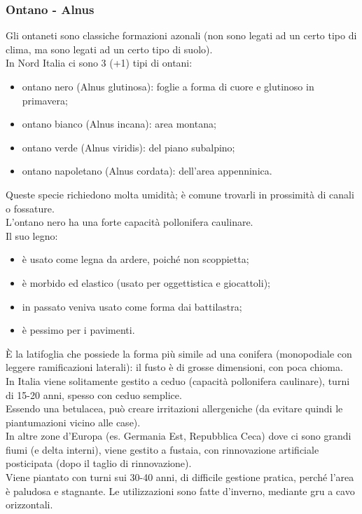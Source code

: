 \subsubsection{Ontano - Alnus}
Gli ontaneti sono classiche formazioni azonali (non sono legati ad un certo tipo di clima, ma sono legati ad un certo tipo di suolo).\\
In Nord Italia ci sono 3 (+1) tipi di ontani:
\begin{itemize}[nosep]
    \item ontano nero (Alnus glutinosa): foglie a forma di cuore e glutinoso in primavera;
    \item ontano bianco (Alnus incana): area montana;
    \item ontano verde (Alnus viridis): del piano subalpino;
    \item ontano napoletano (Alnus cordata): dell'area appenninica.
\end{itemize}
Queste specie richiedono molta umidità; è comune trovarli in prossimità di canali o fossature.\\
L'ontano nero ha una forte capacità pollonifera caulinare.\\
Il suo legno:
\begin{itemize}[nosep]
    \item è usato come legna da ardere, poiché non scoppietta;
    \item è morbido ed elastico (usato per oggettistica e giocattoli);
    \item in passato veniva usato come forma dai battilastra;
    \item è pessimo per i pavimenti.
\end{itemize}
È la latifoglia che possiede la forma più simile ad una conifera (monopodiale con leggere ramificazioni laterali): il fusto è di grosse dimensioni, con poca chioma.\\
In Italia viene solitamente gestito a ceduo (capacità pollonifera caulinare), turni di 15-20 anni, spesso con ceduo semplice.\\
Essendo una betulacea, può creare irritazioni allergeniche (da evitare quindi le piantumazioni vicino alle case).\\
In altre zone d'Europa (es. Germania Est, Repubblica Ceca) dove ci sono grandi fiumi (e delta interni), viene gestito a fustaia, con rinnovazione artificiale posticipata (dopo il taglio di rinnovazione).\\
Viene piantato con turni sui 30-40 anni, di difficile gestione pratica, perché l'area è paludosa e stagnante. Le utilizzazioni sono fatte d'inverno, mediante gru a cavo orizzontali.\\

